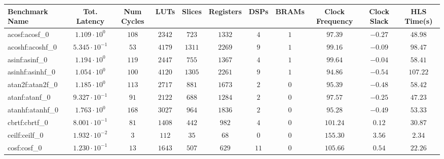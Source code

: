 \begin{tabular}{|l|c|c|c|c|c|c|c|c|c|c|}
\hline
Benchmark Name               & Tot. Latency            & Num Cycles & LUTs      & Slices    & Registers & DSPs    & BRAMs & Clock Frequency & Clock Slack & HLS Time(s) \\
\hline
acosf:acosf\_0               & $ 1.109 \cdot 10^{0}  $ & $ 108    $ & $ 2342  $ & $ 723   $ & $ 1332  $ & $ 4   $ & $ 1 $ & $ 97.39       $ & $ -0.27   $ & $ 48.98   $ \\
acoshf:acoshf\_0             & $ 5.345 \cdot 10^{-1} $ & $ 53     $ & $ 4179  $ & $ 1311  $ & $ 2269  $ & $ 9   $ & $ 1 $ & $ 99.16       $ & $ -0.09   $ & $ 98.47   $ \\
asinf:asinf\_0               & $ 1.194 \cdot 10^{0}  $ & $ 119    $ & $ 2447  $ & $ 755   $ & $ 1367  $ & $ 4   $ & $ 1 $ & $ 99.64       $ & $ -0.04   $ & $ 58.41   $ \\
asinhf:asinhf\_0             & $ 1.054 \cdot 10^{0}  $ & $ 100    $ & $ 4120  $ & $ 1305  $ & $ 2261  $ & $ 9   $ & $ 1 $ & $ 94.86       $ & $ -0.54   $ & $ 107.22  $ \\
atan2f:atan2f\_0             & $ 1.185 \cdot 10^{0}  $ & $ 113    $ & $ 2717  $ & $ 881   $ & $ 1673  $ & $ 2   $ & $ 0 $ & $ 95.39       $ & $ -0.48   $ & $ 58.42   $ \\
atanf:atanf\_0               & $ 9.327 \cdot 10^{-1} $ & $ 91     $ & $ 2122  $ & $ 688   $ & $ 1284  $ & $ 2   $ & $ 0 $ & $ 97.57       $ & $ -0.25   $ & $ 47.23   $ \\
atanhf:atanhf\_0             & $ 1.763 \cdot 10^{0}  $ & $ 168    $ & $ 3027  $ & $ 964   $ & $ 1836  $ & $ 2   $ & $ 0 $ & $ 95.28       $ & $ -0.49   $ & $ 53.33   $ \\
cbrtf:cbrtf\_0               & $ 8.001 \cdot 10^{-1} $ & $ 81     $ & $ 1408  $ & $ 442   $ & $ 982   $ & $ 4   $ & $ 0 $ & $ 101.24      $ & $ 0.12    $ & $ 30.87   $ \\
ceilf:ceilf\_0               & $ 1.932 \cdot 10^{-2} $ & $ 3      $ & $ 112   $ & $ 35    $ & $ 68    $ & $ 0   $ & $ 0 $ & $ 155.30      $ & $ 3.56    $ & $ 2.34    $ \\
cosf:cosf\_0                 & $ 1.230 \cdot 10^{-1} $ & $ 13     $ & $ 1643  $ & $ 507   $ & $ 629   $ & $ 11  $ & $ 0 $ & $ 105.66      $ & $ 0.54    $ & $ 22.26   $ \\

\end{tabular}
